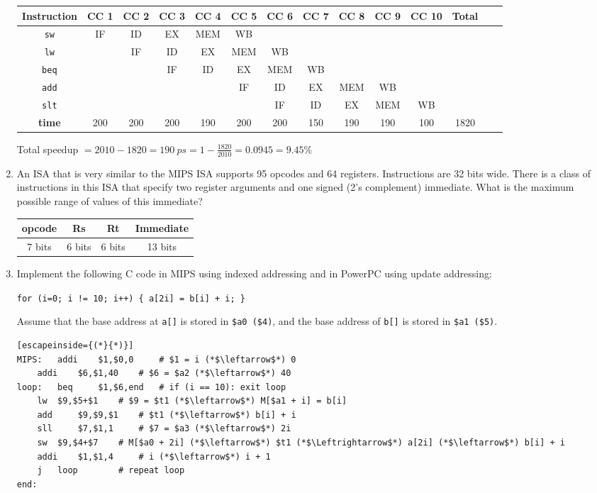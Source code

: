 \documentclass[10pt,letterpaper]{article}
\begin{document}
\begin{enumerate}[label=\textbf{Problem \arabic*.}]
\begin{center}
\begin{tabular}[width=\pagewidth] { |c|c|c|c|c|c|c|c|c|c|c|c|c|c| }
\hline
Instruction & CC 1 & CC 2 & CC 3 & CC 4 & CC 5 & CC 6 & CC 7 & CC 8 & CC 9 & CC 10 & Total\\
\hline
\texttt{sw} & \cellcolor{blue!25}IF & ID & EX & \cellcolor{blue!25}MEM & WB & & & & & & \\
\hline
\texttt{lw} & & \cellcolor{blue!25}IF & ID & EX & MEM & WB & & & & & \\
\hline
\texttt{beq} & & & \cellcolor{blue!25}IF & ID & EX & MEM & WB & & & & \\
\hline
\texttt{add} & & & & & \cellcolor{blue!25}IF & ID & \cellcolor{blue!25}EX & \cellcolor{blue!25}MEM & WB & & \\
\hline
\texttt{slt} & & & & & & \cellcolor{blue!25}IF & ID & EX & \cellcolor{blue!25}MEM & \cellcolor{blue!25}WB & \\ 
\hline
\textbf{time} & 200 & 200 & 200 & 190 & 200 & 200 & 150 & 190 & 190 & 100 & 1820\\
\hline
\end{tabular}\end{center}
Total speedup $= 2010 - 1820 = \boxed{190 \ ps} = 1 - \frac{1820}{2010} = 0.0945 = \boxed{9.45\%}$
\item An ISA that is very similar to the MIPS ISA supports 95 opcodes and 64 registers. Instructions are 32 bits wide. There is a class of instructions in this ISA that specify two register arguments and one signed (2's complement) immediate. What is the maximum possible range of values of this immediate?
\begin{center}\begin{tabular} { |c|c|c|c| }
\hline
opcode & Rs & Rt & Immediate \\
\hline
7 bits & 6 bits & 6 bits & 13 bits \\
\hline
\end{tabular}\end{center}
\item Implement the following C code in MIPS using indexed addressing and in PowerPC using update addressing:
\begin{center}
\texttt{for (i=0; i != 10; i++) \{ a[2i] = b[i] + i; \}}
\end{center}
Assume that the base address at \texttt{a[]} is stored in \texttt{\$a0 (\$4)}, and the base address of \texttt{b[]} is stored in \texttt{\$a1 (\$5)}.
\begin{lstlisting}[escapeinside={(*}{*)}]
MIPS: 	addi 	$1,$0,0 	# $1 = i (*$\leftarrow$*) 0
 	addi 	$6,$1,40 	# $6 = $a2 (*$\leftarrow$*) 40
loop: 	beq 	$1,$6,end 	# if (i == 10): exit loop	
	lw 	$9,$5+$1 	# $9 = $t1 (*$\leftarrow$*) M[$a1 + i] = b[i]
	add 	$9,$9,$1 	# $t1 (*$\leftarrow$*) b[i] + i
	sll 	$7,$1,1 	# $7 = $a3 (*$\leftarrow$*) 2i
	sw 	$9,$4+$7 	# M[$a0 + 2i] (*$\leftarrow$*) $t1 (*$\Leftrightarrow$*) a[2i] (*$\leftarrow$*) b[i] + i
	addi 	$1,$1,4 	# i (*$\leftarrow$*) i + 1
	j 	loop 		# repeat loop
end: 	


\end{lstlisting}
\end{enumerate}
\end{document}

